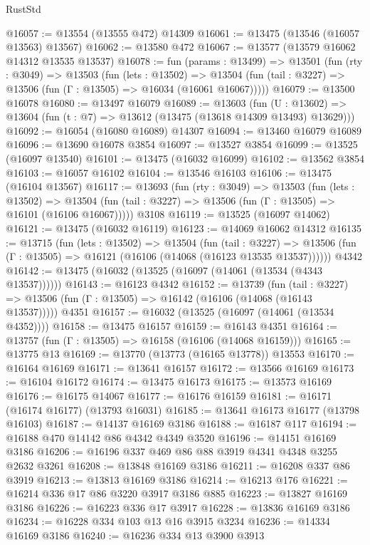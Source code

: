 \begin{lexlean}{RustStd}
\begin{coremodule}
@16057 := @13554 (@13555 @472) @14309
@16061 := @13475 (@13546 (@16057 @13563) @13567)
@16062 := @13580 @472
@16067 := @13577 (@13579 @16062 @14312 @13535 @13537)
@16078 := fun (params : @13499) =>
  @13501
    (fun (rty : @3049) =>
    @13503
      (fun (lets : @13502) =>
      @13504 (fun (tail : @3227) => @13506 (fun (Γ : @13505) => @16034 (@16061 @16067)))))
@16079 := @13500 @16078
@16080 := @13497 @16079
@16089 := @13603
    (fun (U : @13602) => @13604 (fun (t : @7) => @13612 (@13475 (@13618 @14309 @13493) @13629)))
@16092 := @16054 (@16080 @16089) @14307
@16094 := @13460 @16079 @16089
@16096 := @13690 @16078 @3854
@16097 := @13527 @3854
@16099 := @13525 (@16097 @13540)
@16101 := @13475 (@16032 @16099)
@16102 := @13562 @3854
@16103 := @16057 @16102
@16104 := @13546 @16103
@16106 := @13475 (@16104 @13567)
@16117 := @13693
    (fun (rty : @3049) =>
    @13503
      (fun (lets : @13502) =>
      @13504 (fun (tail : @3227) => @13506 (fun (Γ : @13505) => @16101 (@16106 @16067)))))
    @3108
@16119 := @13525 (@16097 @14062)
@16121 := @13475 (@16032 @16119)
@16123 := @14069 @16062 @14312
@16135 := @13715
    (fun (lets : @13502) =>
    @13504
      (fun (tail : @3227) =>
      @13506 (fun (Γ : @13505) => @16121 (@16106 (@14068 (@16123 @13535 @13537))))))
    @4342
@16142 := @13475 (@16032 (@13525 (@16097 (@14061 (@13534 (@4343 @13537))))))
@16143 := @16123 @4342
@16152 := @13739
    (fun (tail : @3227) => @13506 (fun (Γ : @13505) => @16142 (@16106 (@14068 (@16143 @13537)))))
    @4351
@16157 := @16032 (@13525 (@16097 (@14061 (@13534 @4352))))
@16158 := @13475 @16157
@16159 := @16143 @4351
@16164 := @13757 (fun (Γ : @13505) => @16158 (@16106 (@14068 @16159)))
@16165 := @13775 @13
@16169 := @13770 (@13773 (@16165 @13778)) @13553
@16170 := @16164 @16169
@16171 := @13641 @16157
@16172 := @13566 @16169
@16173 := @16104 @16172
@16174 := @13475 @16173
@16175 := @13573 @16169
@16176 := @16175 @14067
@16177 := @16176 @16159
@16181 := @16171 (@16174 @16177) (@13793 @16031)
@16185 := @13641 @16173 @16177 (@13798 @16103)
@16187 := @14137 @16169 @3186
@16188 := @16187 @117
@16194 := @16188 @470 @14142 @86 @4342 @4349 @3520
@16196 := @14151 @16169 @3186
@16206 := @16196 @337 @469 @86 @88 @3919 @4341 @4348 @3255 @2632 @3261
@16208 := @13848 @16169 @3186
@16211 := @16208 @337 @86 @3919
@16213 := @13813 @16169 @3186
@16214 := @16213 @176
@16221 := @16214 @336 @17 @86 @3220 @3917 @3186 @885
@16223 := @13827 @16169 @3186
@16226 := @16223 @336 @17 @3917
@16228 := @13836 @16169 @3186
@16234 := @16228 @334 @103 @13 @16 @3915 @3234
@16236 := @14334 @16169 @3186
@16240 := @16236 @334 @13 @3900 @3913

\end{coremodule}
\end{lexlean}
